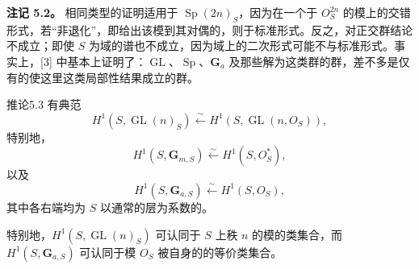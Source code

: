 \textbf{注记 5.2。} 相同类型的证明适用于 $\operatorname{Sp}(2n)_S$，因为在一个于 $O_S^{2n}$ 的模上的交错形式，若“非退化”，即给出该模到其对偶的，则于标准形式。反之，对正交群结论不成立；即使 $S$ 为域的谱也不成立，因为域上的二次形式可能不与标准形式。事实上，[3] 中基本上证明了：$\operatorname{GL}$、$\operatorname{Sp}$、$\mathbf G_a$ 及那些解为这类群的群，差不多是仅有的使这里这类局部性结果成立的群。

\begin{SGAresult}{推论}{5.3}
有典范
\[
H^1(S,\operatorname{GL}(n)_S)\xleftarrow{\sim}H^1(S,\operatorname{GL}(n,O_S)),
\]
特别地，
\[
H^1(S,\mathbf G_{m,S})\xleftarrow{\sim}H^1(S,O_S^*),
\]
以及
\[
H^1(S,\mathbf G_{a,S})\xleftarrow{\sim}H^1(S,O_S),
\]
其中各右端均为 $S$ 以通常的层为系数的。
\end{SGAresult}
特别地，$H^1(S,\operatorname{GL}(n)_S)$ 可认同于 $S$ 上秩 $n$ 的模的类集合，而 $H^1(S,\mathbf G_{a,S})$ 可认同于模 $O_S$ 被自身的的等价类集合。

